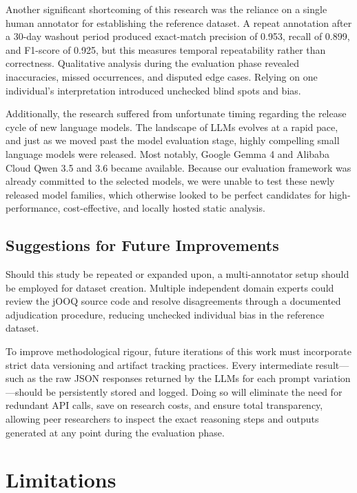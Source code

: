 Another significant shortcoming of this research was the reliance on a single human annotator for establishing the reference dataset. A repeat annotation after a 30-day washout period produced exact-match precision of \num{0.953}, recall of \num{0.899}, and F1-score of \num{0.925}, but this measures temporal repeatability rather than correctness. Qualitative analysis during the evaluation phase revealed inaccuracies, missed occurrences, and disputed edge cases. Relying on one individual's interpretation introduced unchecked blind spots and bias.

Additionally, the research suffered from unfortunate timing regarding the release cycle of new language models. The landscape of LLMs evolves at a rapid pace, and just as we moved past the model evaluation stage, highly compelling small language models were released. Most notably, Google Gemma 4 and Alibaba Cloud Qwen 3.5 and 3.6 became available. Because our evaluation framework was already committed to the selected models, we were unable to test these newly released model families, which otherwise looked to be perfect candidates for high-performance, cost-effective, and locally hosted static analysis.

\subsection{Suggestions for Future Improvements}

Should this study be repeated or expanded upon, a multi-annotator setup should be employed for dataset creation. Multiple independent domain experts could review the jOOQ source code and resolve disagreements through a documented adjudication procedure, reducing unchecked individual bias in the reference dataset.

To improve methodological rigour, future iterations of this work must incorporate strict data versioning and artifact tracking practices. Every intermediate result—such as the raw JSON responses returned by the LLMs for each prompt variation—should be persistently stored and logged. Doing so will eliminate the need for redundant API calls, save on research costs, and ensure total transparency, allowing peer researchers to inspect the exact reasoning steps and outputs generated at any point during the evaluation phase.

\section{Limitations}\label{sec:limitations}


